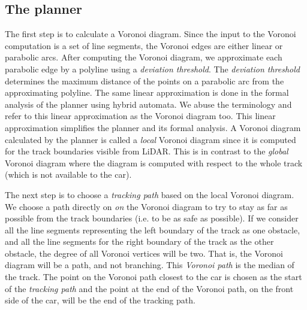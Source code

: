 \subsection{The planner}
\label{sec:voronoiplanner}

The first step is to calculate a Voronoi diagram.
%
Since the input to the Voronoi computation is a set of line segments, the Voronoi edges are either linear or parabolic arcs.
%
After computing the Voronoi diagram, we approximate each parabolic edge by a polyline using a \emph{deviation threshold}.
%
The \emph{deviation threshold} determines the maximum distance of the points on a parabolic arc from the approximating polyline.
%
The same linear approximation is done in the formal analysis of the planner using hybrid automata.
%
We abuse the terminology and refer to this linear approximation as the Voronoi diagram too.
%
This linear approximation simplifies the planner and its formal analysis.
%
A Voronoi diagram calculated by the planner is called a \emph{local} Voronoi diagram since it is computed for the track boundaries visible from LiDAR.
%
This is in contrast to the \emph{global} Voronoi diagram where the diagram is computed with respect to the whole track (which is not available to the car).


The next step is to choose a \emph{tracking path} based on the local Voronoi diagram.
%
We choose a path directly on \emph{on} the Voronoi diagram to try to stay as far as possible from the track boundaries (i.e. to be as safe as possible).
%
If we consider all the line segments representing the left boundary of the track as one obstacle, and all the line segments for the right boundary of the track as the other obstacle, the degree of all Voronoi vertices will be two.
%
That is, the Voronoi diagram will be a path, and not branching.
%
This \emph{Voronoi path} is the median of the track.
%
The point on the Voronoi path closest to the car is chosen as the start of the \emph{tracking path} and the point at the end of the Voronoi path, on the front side of the car, will be the end of the tracking path.
